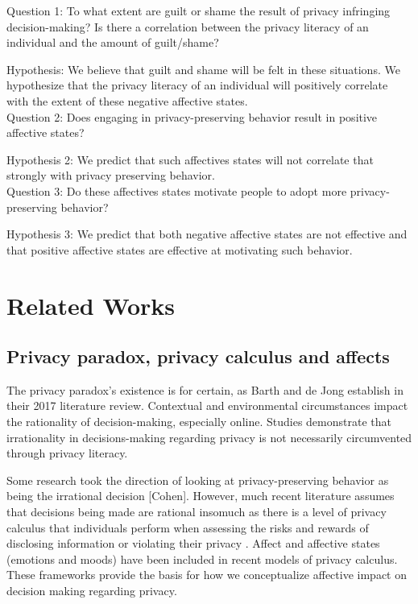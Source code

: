 \documentclass[acmtog]{acmart}
\begin{document}
Question 1: To what extent are guilt or shame the result of privacy infringing
decision-making? Is there a correlation between the privacy literacy of an
individual and the amount of guilt/shame?

Hypothesis: We believe that guilt and shame will be felt in these situations. We
hypothesize that the privacy literacy of an individual will positively correlate
with the extent of these negative affective states. \\

Question 2: Does engaging in privacy-preserving behavior result in positive
affective states?

Hypothesis 2: We predict that such affectives states will not correlate that
strongly with privacy preserving behavior. \\

Question 3: Do these affectives states motivate people to adopt more
privacy-preserving behavior?

Hypothesis 3: We predict that both negative affective states are not effective
and that positive affective states are effective at motivating such behavior.


\section{Related Works}
\subsection{Privacy paradox, privacy calculus and affects}
The privacy paradox’s existence is for certain, as Barth and de Jong establish
in their 2017 literature review. Contextual and environmental circumstances
impact the rationality of decision-making, especially online. Studies
demonstrate that irrationality in decisions-making regarding privacy is not
necessarily circumvented through privacy literacy. \cite{Barth2017}

Some research took the direction of looking at privacy-preserving behavior as
being the irrational decision [Cohen]. However, much recent literature assumes
that decisions being made are rational insomuch as there is a level of privacy
calculus that individuals perform when assessing the risks and rewards of
disclosing information or violating their privacy
\cite{Kehr2015}\cite{Jian2013}. Affect and affective states (emotions and moods)
have been included in recent models of privacy calculus. These frameworks
provide the basis for how we conceptualize affective impact on decision making
regarding privacy.
\end{document}
